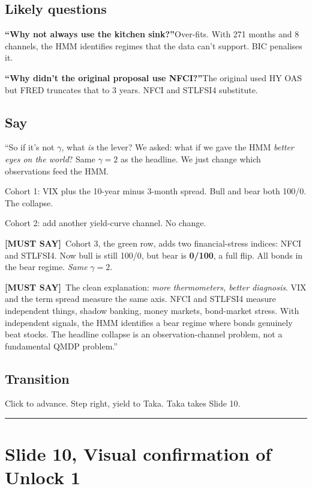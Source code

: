 \documentclass[11pt]{article}
\newcommand{\mustsay}[1]{\textcolor{must}{\textbf{[MUST SAY]}}\ #1}
\begin{document}
\subsection*{Likely questions}

\textbf{``Why not always use the kitchen sink?''}\quad Over-fits. With 271 months and 8 channels, the HMM identifies regimes that the data can't support. BIC penalises it.

\textbf{``Why didn't the original proposal use NFCI?''}\quad The original used HY OAS but FRED truncates that to 3 years. NFCI and STLFSI4 substitute.

\subsection*{Say}

``So if it's not $\gamma$, what \emph{is} the lever? We asked: what if we gave the HMM \emph{better eyes on the world}? Same $\gamma = 2$ as the headline. We just change which observations feed the HMM.

Cohort 1: VIX plus the 10-year minus 3-month spread. Bull and bear both 100/0. The collapse.

Cohort 2: add another yield-curve channel. No change.

\mustsay{Cohort 3, the green row, adds two financial-stress indices: NFCI and STLFSI4. Now bull is still 100/0, but bear is \textbf{0/100}, a full flip. All bonds in the bear regime. \emph{Same} $\gamma = 2$.}

\mustsay{The clean explanation: \emph{more thermometers, better diagnosis}. VIX and the term spread measure the same axis. NFCI and STLFSI4 measure independent things, shadow banking, money markets, bond-market stress. With independent signals, the HMM identifies a bear regime where bonds genuinely beat stocks. The headline collapse is an observation-channel problem, not a fundamental QMDP problem.''}

\subsection*{Transition}

Click to advance. Step right, yield to Taka. Taka takes Slide 10.

\bigskip\hrule

\section*{Slide 10, Visual confirmation of Unlock 1}
\end{document}

